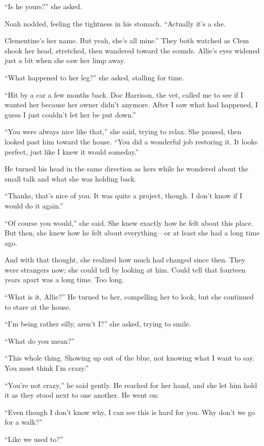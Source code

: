 \documentclass[10pt, twoside, openright]{book}
\begin{document}
``Is he yours?'' she asked.

Noah nodded, feeling the tightness in his stomach. ``Actually it's a
she.


Clementine's her name. But yeah, she's all mine.'' They both watched as
Clem shook her head, stretched, then wandered toward the sounds. Allie's
eyes widened just a bit when she saw her limp away.


``What happened to her leg?'' she asked, stalling for time.


``Hit by a car a few months back. Doc Harrison, the vet, called me to
see if I wanted her because her owner didn't anymore. After I saw what
had happened, I guess I just couldn't let her be put down.''

``You were always nice like that,'' she said, trying to relax. She
paused, then looked past him toward the house. ``You did a wonderful job
restoring it. It looks perfect, just like I knew it would someday.''

He turned his head in the same direction as hers while he wondered about
the small talk and what she was holding back.

``Thanks, that's nice of you. It was quite a project, though. I don't
know if I would do it again.''

``Of course you would,'' she said. She knew exactly how he felt about
this place. But then, she knew how he felt about everything---or at
least she had a long time ago.

And with that thought, she realized how much had changed since then.
They were strangers now; she could tell by looking at him. Could tell
that fourteen years apart was a long time. Too long.

``What is it, Allie?'' He turned to her, compelling her to look, but she
continued to stare at the house.


``I'm being rather silly, aren't I?'' she asked, trying to smile.

``What do you mean?''


``This whole thing. Showing up out of the blue, not knowing what I want
to say. You must think I'm crazy.''

``You're not crazy,'' he said gently. He reached for her hand, and she
let him hold it as they stood next to one another. He went on:

``Even though I don't know why, I can see this is hard for you. Why
don't we go for a walk?''


``Like we used to?''
\end{document}
